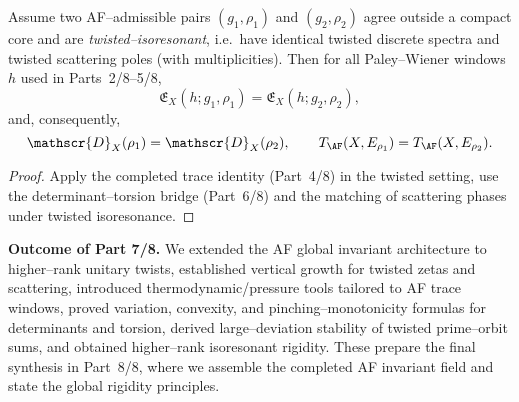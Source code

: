 \begin{theorem}
\label{thm:iso-hr}
Assume two AF–admissible pairs $(g_1,\rho_1)$ and $(g_2,\rho_2)$ agree outside a compact core and are \emph{twisted–isoresonant}, i.e.\ have identical twisted discrete spectra and twisted scattering poles (with multiplicities). Then for all Paley–Wiener windows $h$ used in Parts~2/8–5/8,
\[
\mathfrak{E}_X(h;g_1,\rho_1)=\mathfrak{E}_X(h;g_2,\rho_2),
\]
and, consequently,
\[
\mathscr{D}_X(\rho_1)=\mathscr{D}_X(\rho_2),\qquad
T_{\AF}(X,E_{\rho_1})=T_{\AF}(X,E_{\rho_2}).
\]
\end{theorem}

\begin{proof}
Apply the completed trace identity (Part~4/8) in the twisted setting, use the determinant–torsion bridge (Part~6/8) and the matching of scattering phases under twisted isoresonance. %
\end{proof}


\noindent\textbf{Outcome of Part 7/8.}
We extended the AF global invariant architecture to higher–rank unitary twists, established vertical growth for twisted zetas and scattering, introduced thermodynamic/pressure tools tailored to AF trace windows, proved variation, convexity, and pinching–monotonicity formulas for determinants and torsion, derived large–deviation stability of twisted prime–orbit sums, and obtained higher–rank isoresonant rigidity. These prepare the final synthesis in Part~8/8, where we assemble the completed AF invariant field and state the global rigidity principles. %


